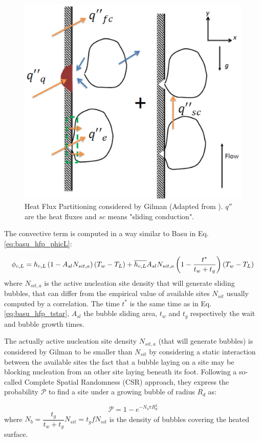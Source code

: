 \begin{figure}[!h]
\centering
\includegraphics[width=0.6\linewidth]{img/HFP/Gilman/hfp_model.PNG}
\caption{Heat Flux Partitioning considered by Gilman \cite{gilman_development_2014} (Adapted from \cite{gilman_self-consistent_2017}). $q''$ are the heat fluxes and $sc$ means "sliding conduction".}
\label{fig:gilman_hfp}
\end{figure}


The convective term is computed in a way similar to Basu \etal \cite{basu_wall_2005} in Eq. \ref{eq:basu_hfp_phicL}:

\begin{equation}
\phi_{c,L} = h_{c,L}\left( 1-A_{sl}N_{sit,a} \right)\left( T_{w}-T_{L} \right) + \overline{h_{c,L}}A_{sl}N_{sit,a}\left( 1 - \frac{t^{*}}{t_{w}+t_{g}} \right)\left( T_{w}-T_{L} \right)
\label{eq:gilman_hfp_phicL}
\end{equation}
where $N_{sit,a}$ is the active nucleation site density that will generate sliding bubbles, that can differ from the empirical value of available sites $N_{sit}$ usually computed by a correlation. The time $t^{*}$ is the same time as in Eq. \ref{eq:basu_hfp_tstar}, $A_{sl}$ the bubble sliding area, $t_{w}$ and $t_{g}$ respectively the wait and bubble growth times.

\npar

The actually active nucleation site density $N_{sit,a}$ (that will generate bubbles) is considered by Gilman to be smaller than $N_{sit}$ by considering a static interaction between the available sites \ie the fact that a bubble laying on a site may be blocking nucleation from an other site laying beneath its foot. Following a so-called Complete Spatial Randomness (CSR) approach, they express the probability $\mathcal{P}$ to find a site under a growing bubble of radius $R_{d}$ as:

\begin{equation}
\mathcal{P} = 1-e^{-N_{b}\pi R_{d}^{2}}
\label{eq:gilman_hfp_pinter}
\end{equation} 
where $N_{b} = \dfrac{t_{g}}{t_{w}+t_{g}}N_{sit} = t_{g} f N_{sit}$ is the density of bubbles covering the heated surface.

